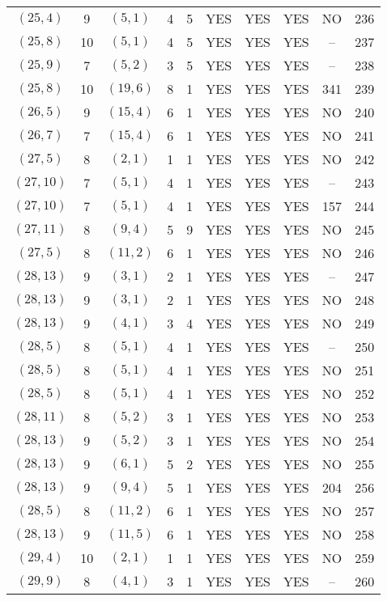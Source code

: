 \begin{longtable}{|c|c|c|c|c|c|c|c|c|c|}
$(25, 4)$ & 9 & $(5, 1)$ & 4 & 5 & YES & YES & YES & NO & 236\\
$(25, 8)$ & 10 & $(5, 1)$ & 4 & 5 & YES & YES & YES & -- & 237\\
$(25, 9)$ & 7 & $(5, 2)$ & 3 & 5 & YES & YES & YES & -- & 238\\
$(25, 8)$ & 10 & $(19, 6)$ & 8 & 1 & YES & YES & YES & 341 & 239\\
$(26, 5)$ & 9 & $(15, 4)$ & 6 & 1 & YES & YES & YES & NO & 240\\
$(26, 7)$ & 7 & $(15, 4)$ & 6 & 1 & YES & YES & YES & NO & 241\\
$(27, 5)$ & 8 & $(2, 1)$ & 1 & 1 & YES & YES & YES & NO & 242\\
$(27, 10)$ & 7 & $(5, 1)$ & 4 & 1 & YES & YES & YES & -- & 243\\
$(27, 10)$ & 7 & $(5, 1)$ & 4 & 1 & YES & YES & YES & 157 & 244\\
$(27, 11)$ & 8 & $(9, 4)$ & 5 & 9 & YES & YES & YES & NO & 245\\
$(27, 5)$ & 8 & $(11, 2)$ & 6 & 1 & YES & YES & YES & NO & 246\\
$(28, 13)$ & 9 & $(3, 1)$ & 2 & 1 & YES & YES & YES & -- & 247\\
$(28, 13)$ & 9 & $(3, 1)$ & 2 & 1 & YES & YES & YES & NO & 248\\
$(28, 13)$ & 9 & $(4, 1)$ & 3 & 4 & YES & YES & YES & NO & 249\\
$(28, 5)$ & 8 & $(5, 1)$ & 4 & 1 & YES & YES & YES & -- & 250\\
$(28, 5)$ & 8 & $(5, 1)$ & 4 & 1 & YES & YES & YES & NO & 251\\
$(28, 5)$ & 8 & $(5, 1)$ & 4 & 1 & YES & YES & YES & NO & 252\\
$(28, 11)$ & 8 & $(5, 2)$ & 3 & 1 & YES & YES & YES & NO & 253\\
$(28, 13)$ & 9 & $(5, 2)$ & 3 & 1 & YES & YES & YES & NO & 254\\
$(28, 13)$ & 9 & $(6, 1)$ & 5 & 2 & YES & YES & YES & NO & 255\\
$(28, 13)$ & 9 & $(9, 4)$ & 5 & 1 & YES & YES & YES & 204 & 256\\
$(28, 5)$ & 8 & $(11, 2)$ & 6 & 1 & YES & YES & YES & NO & 257\\
$(28, 13)$ & 9 & $(11, 5)$ & 6 & 1 & YES & YES & YES & NO & 258\\
$(29, 4)$ & 10 & $(2, 1)$ & 1 & 1 & YES & YES & YES & NO & 259\\
$(29, 9)$ & 8 & $(4, 1)$ & 3 & 1 & YES & YES & YES & -- & 260\\

\end{longtable}

